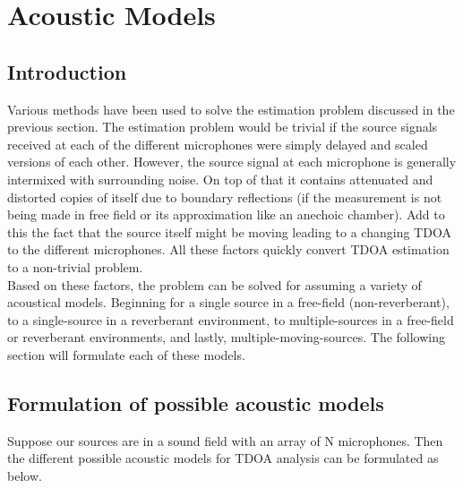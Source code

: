 \section{Acoustic Models}
\subsection{Introduction}
Various methods have been used \cite{benesty2008microphone} to solve the estimation problem discussed in the previous section. The estimation problem would be trivial if the source signals received at each of the different microphones were simply delayed and scaled versions of each other. However, the source signal at each microphone is generally intermixed with surrounding noise. On top of that it contains attenuated and distorted copies of itself due to boundary reflections (if the measurement is not being made in free field or its approximation like an anechoic chamber). Add to this the fact that the source itself might be moving leading to a changing TDOA to the different microphones. All these factors quickly convert TDOA estimation to a non-trivial problem. \\
Based on these factors, the problem can be solved for assuming a variety of acoustical models. Beginning for a single source in a free-field (non-reverberant), to a single-source in a reverberant environment, to multiple-sources in a free-field or reverberant environments, and lastly, multiple-moving-sources. The following section will formulate each of these models.

\subsection{Formulation of possible acoustic models}
Suppose our sources are in a sound field with an array of N microphones. Then the different possible acoustic models for TDOA analysis can be formulated as below.

